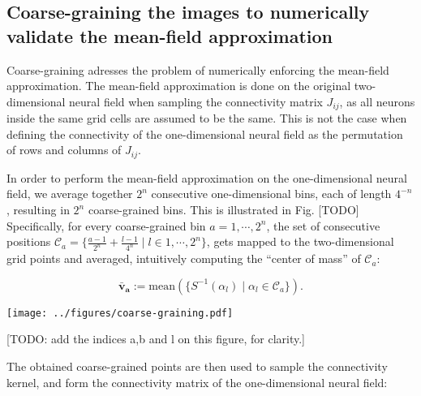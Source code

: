 \documentclass[10pt,letterpaper]{article}
\renewcommand{\vec}[1]{\boldsymbol{#1}}
\begin{document}

\subsection{Coarse-graining the images to numerically validate the mean-field approximation} \label{sec:coarse-graining}

Coarse-graining adresses the problem of numerically enforcing the mean-field approximation. The mean-field approximation is done on the original two-dimensional neural field when sampling the connectivity matrix $J_{ij}$, as all neurons inside the same grid cells are assumed to be the same. This is not the case when defining the connectivity of the one-dimensional neural field as the permutation of rows and columns of $J_{ij}$.

In order to perform the mean-field approximation on the one-dimensional neural field, we average together $2^n$ consecutive one-dimensional bins, each of length $4^{-n}$, resulting in $2^n$ coarse-grained bins. This is illustrated in Fig. [TODO] Specifically, for every coarse-grained bin $a=1,\cdots,2^n$, the set of consecutive positions $\mathcal{C}_a = \{\tfrac{a-1}{2^n} + \tfrac{l-1}{4^n} \;|\; l \in 1, \cdots, 2^n\}$, gets mapped to the two-dimensional grid points and averaged, intuitively computing the ``center of mass'' of $\mathcal{C}_a$:

\begin{equation*}
\vec{\bar v_a} := \textrm{mean}(\{S^{-1}(\alpha_l) \;|\; \alpha_l \in \mathcal{C}_a\}).
\end{equation*}

\texttt{[image: ../figures/coarse-graining.pdf]}

[TODO: add the indices a,b and l on this figure, for clarity.]
\endif

The obtained coarse-grained points are then used to sample the connectivity kernel, and form the connectivity matrix of the one-dimensional neural field:
\end{document}
